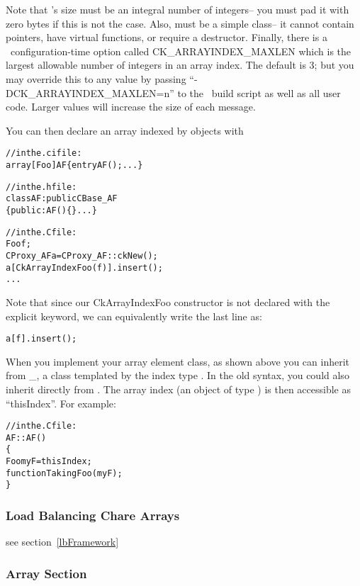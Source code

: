 Note that 's size must be an integral number of integers--
you must pad it with zero bytes if this is not the case.
Also,  must be a simple class-- it cannot contain 
pointers, have virtual functions, or require a destructor.
Finally, there is a \charmpp\ configuration-time option called
CK\_ARRAYINDEX\_MAXLEN  
which is the largest allowable number of 
integers in an array index.  The default is 3; but you may 
override this to any value by passing ``-DCK\_ARRAYINDEX\_MAXLEN=n'' 
to the \charmpp\ build script as well as all user code. Larger 
values will increase the size of each message.

You can then declare an array indexed by  objects with

\begin{alltt}
//in the .ci file:
array [Foo] AF \{ entry AF(); ... \}

//in the .h file:
class AF : public CBase\_AF
\{ public: AF() \{\} ... \}

//in the .C file:
    Foo f;
    CProxy_AF a=CProxy_AF::ckNew();
    a[CkArrayIndexFoo(f)].insert();
    ...
\end{alltt}

Note that since our CkArrayIndexFoo constructor is not declared
with the explicit keyword, we can equivalently write the last line as:

\begin{alltt}
    a[f].insert();
\end{alltt}

When you implement your array element class, as shown above you 
can inherit from \_, 
a class templated by the index type . In the old syntax,
you could also inherit directly from .
The array index (an object of type ) is then accessible as 
``thisIndex''. For example:

\begin{alltt}

//in the .C file:
AF::AF()
\{
    Foo myF=thisIndex;
    functionTakingFoo(myF);
\}
\end{alltt}

\subsubsection{Load Balancing Chare Arrays}

see section~\ref{lbFramework}

\subsubsection{Array Section}

